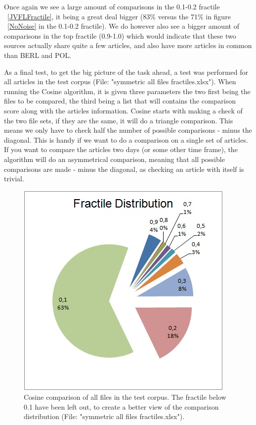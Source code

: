 Once again we see a large amount of comparisons in the 0.1-0.2 fractile ~\ref{JVFLFractile}, it being a great deal bigger (83\% versus the 71\% in figure ~\ref{NoNoise} in the 0.1-0.2 fractile). We do however also see a bigger amount of comparisons in the top fractile (0.9-1.0) which would indicate that these two sources actually share quite a few articles, and also have more articles in common than BERL and POL.

As a final test, to get the big picture of the task ahead, a test was performed for all articles in the test corpus (File: "symmetric all files fractiles.xlsx"). When running the Cosine algorithm, it is given three parameters the two first being the files to be compared, the third being a list that will contains the comparison score along with the articles information. Cosine starts with making a check of the two file sets, if they are the same, it will do a triangle comparison. This means we only have to check half the number of possible comparisons - minus the diagonal. This is handy if we want to do a comparison on a single set of articles. If you want to compare the articles two days (or some other time frame), the algorithm will do an asymmetrical comparison, meaning that all possible comparisons are made - minus the diagonal, as checking an article with itself is trivial.

\begin{figure}
	\centering
	\includegraphics[scale=1.0]{figures/AllFilesFractile}
	\caption{Cosine comparison of all files in the test corpus. The fractile below 0.1 have been left out, to create a better view of the comparison distribution (File: "symmetric all files fractiles.xlsx").}
	\label{Fractles}
\end{figure}


